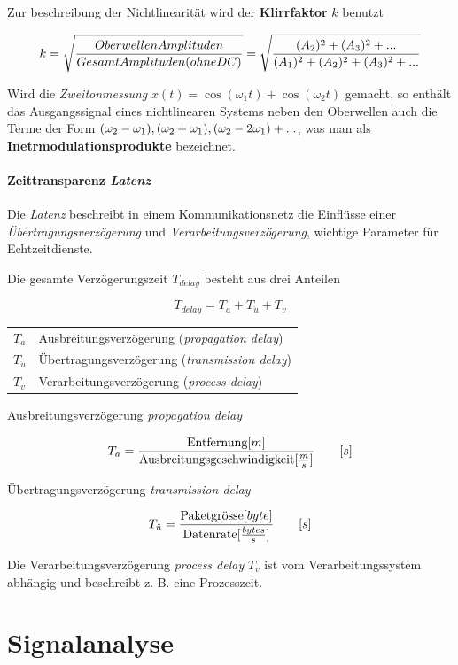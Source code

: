 \documentclass[
  10pt,
  a4paper,
  german]{article}
\makeatletter
\let\oldparagraph\paragraph
\renewcommand{\paragraph}[1]{\oldparagraph{#1}\mbox{}}
\numberwithin{equation}{section}
\newenvironment{conditions}
  {\par\vspace{\abovedisplayskip}\noindent\begin{tabular}{>{$}l<{$} @{${}:{}$} l}}
  {\end{tabular}\par\vspace{\belowdisplayskip}}
\let\paragraph\oldparagraph
\renewcommand{\paragraph}[1]{\oldparagraph{#1}\mbox{}\par}
\makeatother
\begin{document}
Zur beschreibung der Nichtlinearität wird der \textbf{Klirrfaktor} \(k\)
benutzt

\[
k=\sqrt{\frac{Oberwellen\space Amplituden}{Gesamt\space Amplituden\space (ohne\space DC)}}=\sqrt{\frac{(A_2)^2+(A_3)^2+...}{(A_1)^2+(A_2)^2+(A_3)^2+...}}
\]

Wird die \emph{Zweitonmessung} \(x(t)=\cos(\omega_1t)+\cos(\omega_2t)\)
gemacht, so enthält das Ausgangssignal eines nichtlinearen Systems neben
den Oberwellen auch die Terme der Form
\((\omega_2-\omega_1),\space(\omega_2+\omega_1),\space(\omega_2-2\omega_1)+...\),
was man als \textbf{Inetrmodulationsprodukte} bezeichnet.

\hypertarget{zeittransparenz-latenz}{%
\paragraph{\texorpdfstring{Zeittransparenz
\emph{Latenz}}{Zeittransparenz Latenz}}\label{zeittransparenz-latenz}}

Die \emph{Latenz} beschreibt in einem Kommunikationsnetz die Einflüsse
einer \emph{Übertragungsverzögerung} und
\emph{Verarbeitungsverzögerung}, wichtige Parameter für Echtzeitdienste.

Die gesamte Verzögerungszeit \(T_{delay}\) besteht aus drei Anteilen

\[
T_{delay}=T_a+T_{\ddot{u}}+T_v
\]

\begin{conditions}
  T_a & Ausbreitungsverzögerung (\textit{propagation delay}) \\
  T_{\ddot{u}} & Übertragungsverzögerung (\textit{transmission delay}) \\
  T_v & Verarbeitungsverzögerung (\textit{process delay}) \\
\end{conditions}

Ausbreitungsverzögerung \emph{propagation delay}

\[
T_a=\frac{\text{Entfernung}\space [m]}{\text{Ausbreitungsgeschwindigkeit}\space[\frac{m}{s}]}\qquad[s]
\]

Übertragungsverzögerung \emph{transmission delay}

\[
T_{\ddot{u}}=\frac{\text{Paketgrösse}\space[byte]}{\text{Datenrate}\space[\frac{bytes}{s}]}\qquad[s]
\]

Die Verarbeitungsverzögerung \emph{process delay} \(T_v\) ist vom
Verarbeitungssystem abhängig und beschreibt z. B. eine Prozesszeit.

\hypertarget{signalanalyse}{%
\section{Signalanalyse}\label{signalanalyse}}
\end{document}
